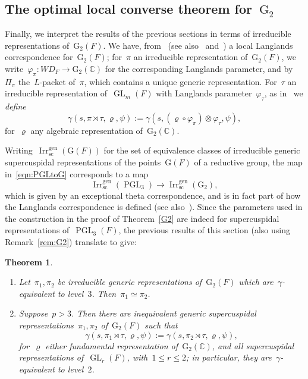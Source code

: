 \documentclass[12pt]{amsart}
\newcommand{\BC}{\mathbb {C}}
\newcommand{\scusp}{\mathrm{sc}}
\newcommand{\GL}{\operatorname{GL}}
\newcommand{\Irr}{\operatorname{Irr}}
\newcommand{\Irrgen}{\Irr^{\operatorname{gen}}}
\newcommand{\PGL}{\operatorname{PGL}}
\newcommand{\G}{\mathrm{G}}
\newcommand{\WD}{{WD}}
\newtheorem{thm}{Theorem}[section]
\newtheorem{thm}[equation]{Theorem}
\begin{document}
\subsection{The optimal local converse theorem for~$\G_2$}\label{g2lct}
Finally, we interpret the results of the previous sections in terms of irreducible representations of~$\G_2(F)$. We have, from~\cite{GS23a} (see also~\cite{HKT21} and~\cite{AX22}) a local Langlands correspondence for~$\G_2(F)$; for~$\pi$ an irreducible representation of~$\G_2(F)$, we write~$\varphi_\pi: \WD_F\to \G_2(\mathbb{C})$ for the corresponding Langlands parameter, and by~$\Pi_{\pi}$ the~$L$-packet of~$\pi$, which contains a unique generic representation. For~$\tau$ an irreducible representation of~$\GL_m(F)$ with Langlands parameter~$\varphi_\tau$, as in~\cite{GS23b} we \emph{define}
\[
\gamma(s,\pi\rtimes\tau,\varrho,\psi) := \gamma(s,(\varrho\circ\varphi_{\pi})\otimes\varphi_\tau,\psi),
\]
for~$\varrho$ any algebraic representation of~$\G_2(\BC)$.

Writing~$\Irrgen_\scusp(\G(F))$ for the set of equivalence classes of irreducible generic supercuspidal representations of the points~$\G(F)$ of a reductive group, the map in~\eqref{eqn:PGLtoG} corresponds to a map
\[
\Irrgen_{\scusp}(\PGL_3) \to \Irrgen_{\scusp}(\G_2),
\]
which is given by an exceptional theta correspondence, and is in fact part of how the Langlands correspondence is defined (see also~\cite[Theorem~1.8]{SWe11}). Since the parameters used in the construction in the proof of Theorem~\ref{G2} are indeed for supercuspidal representations of~$\PGL_3(F)$, the previous results of this section (also using Remark~\ref{rem:G2}) translate to give:

\begin{thm}\label{thm:converseG2}
\begin{enumerate}
\item Let~$\pi_1,\pi_2$ be irreducible generic representations of~$\G_2(F)$ which are~$\gamma$-equivalent to level~$3$. Then~$\pi_1\simeq\pi_2$.
\item Suppose~$p>3$. Then there are inequivalent generic supercuspidal representations~$\pi_1,\pi_2$ of~$\G_2(F)$ such that
\[
\gamma(s,\pi_1\rtimes\tau,\varrho,\psi) := \gamma(s,\pi_2\rtimes\tau,\varrho,\psi) ,
\]
for~$\varrho$ either fundamental representation of~$\G_2(\BC)$, and all supercuspidal representations of~$\GL_r(F)$, with~$1\le r\le 2$; in particular, they are~$\gamma$-equivalent to level~$2$.
\end{enumerate}
\end{thm}
\end{document}
